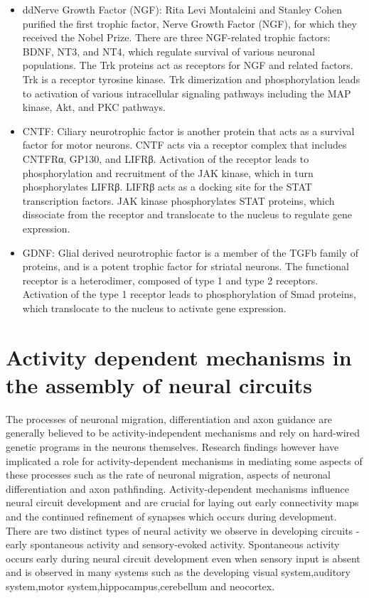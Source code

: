 \documentclass[]{book}
\providecommand{\tightlist}{%
  \setlength{\itemsep}{0pt}\setlength{\parskip}{0pt}}
\begin{document}
\begin{itemize}
\tightlist
\item
  ddNerve Growth Factor (NGF): Rita Levi Montalcini and Stanley Cohen purified the first trophic factor, Nerve Growth Factor (NGF), for which they received the Nobel Prize. There are three NGF-related trophic factors: BDNF, NT3, and NT4, which regulate survival of various neuronal populations. The Trk proteins act as receptors for NGF and related factors. Trk is a receptor tyrosine kinase. Trk dimerization and phosphorylation leads to activation of various intracellular signaling pathways including the MAP kinase, Akt, and PKC pathways.
\item
  CNTF: Ciliary neurotrophic factor is another protein that acts as a survival factor for motor neurons. CNTF acts via a receptor complex that includes CNTFRα, GP130, and LIFRβ. Activation of the receptor leads to phosphorylation and recruitment of the JAK kinase, which in turn phosphorylates LIFRβ. LIFRβ acts as a docking site for the STAT transcription factors. JAK kinase phosphorylates STAT proteins, which dissociate from the receptor and translocate to the nucleus to regulate gene expression.
\item
  GDNF: Glial derived neurotrophic factor is a member of the TGFb family of proteins, and is a potent trophic factor for striatal neurons. The functional receptor is a heterodimer, composed of type 1 and type 2 receptors. Activation of the type 1 receptor leads to phosphorylation of Smad proteins, which translocate to the nucleus to activate gene expression.
\end{itemize}

\hypertarget{activity-dependent-mechanisms-in-the-assembly-of-neural-circuits}{%
\section{Activity dependent mechanisms in the assembly of neural circuits}\label{activity-dependent-mechanisms-in-the-assembly-of-neural-circuits}}

The processes of neuronal migration, differentiation and axon guidance are generally believed to be activity-independent mechanisms and rely on hard-wired genetic programs in the neurons themselves. Research findings however have implicated a role for activity-dependent mechanisms in mediating some aspects of these processes such as the rate of neuronal migration, aspects of neuronal differentiation and axon pathfinding. Activity-dependent mechanisms influence neural circuit development and are crucial for laying out early connectivity maps and the continued refinement of synapses which occurs during development. There are two distinct types of neural activity we observe in developing circuits -early spontaneous activity and sensory-evoked activity. Spontaneous activity occurs early during neural circuit development even when sensory input is absent and is observed in many systems such as the developing visual system,auditory system,motor system,hippocampus,cerebellum and neocortex.
\end{document}
